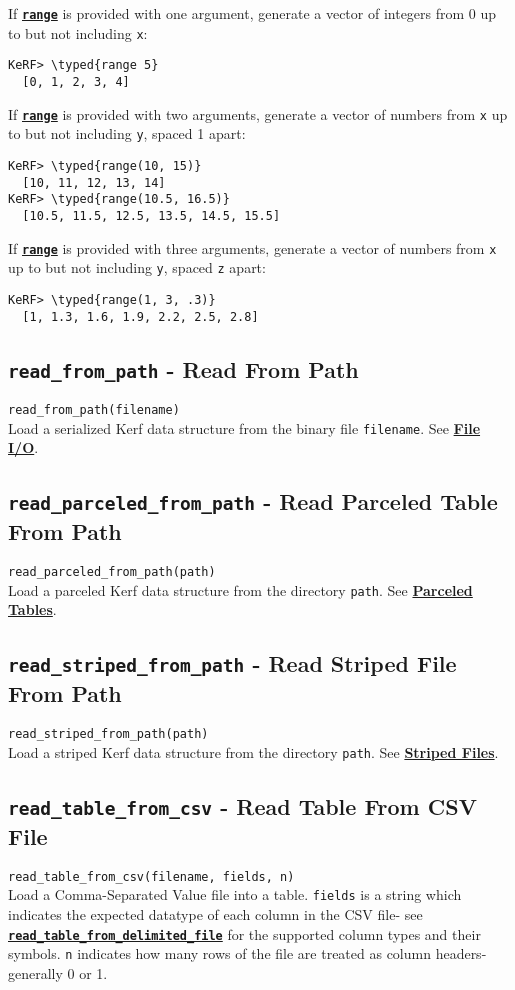 \documentclass{article}
\newcommand{\typed}[1]{\textcolor{TealBlue}{#1}}
\newcommand{\primdefu}[3]{\subsection{\texttt{#1} - #2}\label{prim:#3}}
\newcommand{\primu}[2]{\hyperref[prim:#2]{\textbf{\texttt{#1}}}}
\newcommand{\prim}[1]{\primu{#1}{#1}}
\begin{document}
If \prim{range} is provided with one argument, generate a vector of integers from 0 up to but not including \texttt{x}:
\begin{Verbatim}
KeRF> \typed{range 5}
  [0, 1, 2, 3, 4]
\end{Verbatim}

If \prim{range} is provided with two arguments, generate a vector of numbers from \texttt{x} up to but not including \texttt{y}, spaced 1 apart:
\begin{Verbatim}
KeRF> \typed{range(10, 15)}
  [10, 11, 12, 13, 14]
KeRF> \typed{range(10.5, 16.5)}
  [10.5, 11.5, 12.5, 13.5, 14.5, 15.5]
\end{Verbatim}

If \prim{range} is provided with three arguments, generate a vector of numbers from \texttt{x} up to but not including \texttt{y}, spaced \texttt{z} apart:
\begin{Verbatim}
KeRF> \typed{range(1, 3, .3)}
  [1, 1.3, 1.6, 1.9, 2.2, 2.5, 2.8]
\end{Verbatim}

\primdefu{read\_from\_path}{Read From Path}{readFromPath}
\texttt{read\_from\_path(filename)}\\

Load a serialized Kerf data structure from the binary file \texttt{filename}. See \hyperref[sec:fileio]{\textbf{File I/O}}.


\primdefu{read\_parceled\_from\_path}{Read Parceled Table From Path}{readParceledFromPath}
\texttt{read\_parceled\_from\_path(path)}\\

Load a parceled Kerf data structure from the directory \texttt{path}. See \hyperref[sec:parcels]{\textbf{Parceled Tables}}.

\primdefu{read\_striped\_from\_path}{Read Striped File From Path}{readStripedFromPath}
\texttt{read\_striped\_from\_path(path)}\\

Load a striped Kerf data structure from the directory \texttt{path}. See \hyperref[sec:stripeio]{\textbf{Striped Files}}.

\primdefu{read\_table\_from\_csv}{Read Table From CSV File}{readTableFromCsv}
\texttt{read\_table\_from\_csv(filename, fields, n)}\\

Load a Comma-Separated Value file into a table. \texttt{fields} is a string which indicates the expected datatype of each column in the CSV file- see \primu{read\_table\_from\_delimited\_file}{readTableFromDelimitedFile} for the supported column types and their symbols. \texttt{n} indicates how many rows of the file are treated as column headers- generally 0 or 1.\\
\end{document}
